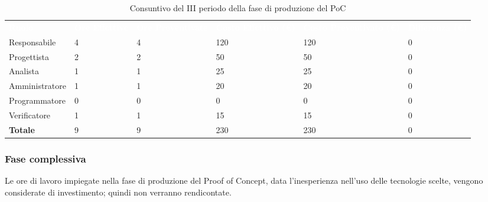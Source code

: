 \begin{table}[H]
\begin{center}
\renewcommand{\arraystretch}{1.5}
\begin{tabular}{ m{}<{\centering}  m{}<{\centering} m{}<{\centering} m{}<{\centering} m{}<{\centering} m{}<{\centering}}
	\rowcolor{darkblue}
	\textcolor{white}{\textbf{Ruolo}} & \textcolor{white}{\textbf{Ore Effettive}} & \textcolor{white}{\textbf{Ore Preventivate}}&\textcolor{white}{\textbf{Costo Effettivo (\euro) }}&\textcolor{white}{\textbf{Costo Preventivato (\euro)}}&\textcolor{white}{\textbf{Differenza (\euro)}}\\ 
	
	Responsabile  & 4 & 4 & 120 & 120 & 0\\	
	
	Progettista & 2 & 2 & 50 & 50 & 0\\
	
	Analista & 1  & 1 & 25 & 25 & 0 \\

	Amministratore & 1 & 1 & 20 & 20 & 0 \\
	
	Programmatore & 0 &0 &0 & 0 & 0 \\
	
	Verificatore & 1 & 1 & 15 & 15 & 0 \\
	
	\textbf{Totale} & 9 & 9 & 230 & 230 & 0 \\
	
\end{tabular}
\caption{Consuntivo del III periodo della fase di produzione del PoC}
\end{center}
\end{table}

\subsubsection{Fase complessiva}
Le ore di lavoro impiegate nella fase di produzione del Proof of Concept, data l'inesperienza nell'uso delle tecnologie scelte, vengono considerate di investimento; quindi non verranno rendicontate.

